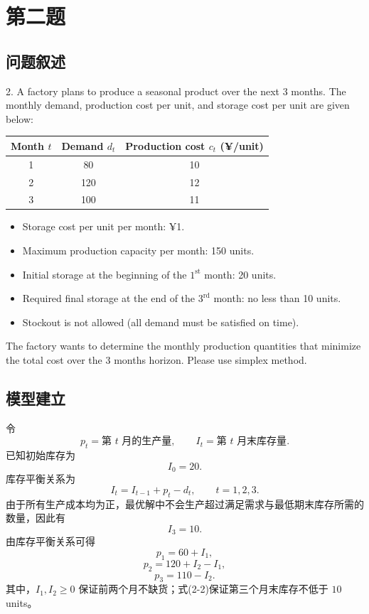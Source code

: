 ﻿\documentclass[UTF8,zihao=-4,fontset=none]{ctexart}
\begin{document}
\section{第二题}

\subsection{问题叙述}

2. A factory plans to produce a seasonal product over the next 3 months. The monthly demand, production cost per unit, and storage cost per unit are given below:

\begin{center}
\begin{tabular}{ccc}
\toprule
Month \(t\) & Demand \(d_t\) & Production cost \(c_t\) (¥/unit)\\
\midrule
1 & 80  & 10\\
2 & 120 & 12\\
3 & 100 & 11\\
\bottomrule
\end{tabular}
\end{center}

\begin{itemize}[leftmargin=2.3em]
  \item Storage cost per unit per month: ¥1.
  \item Maximum production capacity per month: 150 units.
  \item Initial storage at the beginning of the \(1^{\mathrm{st}}\) month: 20 units.
  \item Required final storage at the end of the \(3^{\mathrm{rd}}\) month: no less than 10 units.
  \item Stockout is not allowed (all demand must be satisfied on time).
\end{itemize}

The factory wants to determine the monthly production quantities that minimize the total cost over the 3 months horizon. Please use simplex method.

\subsection{模型建立}

令
\[
    p_t=\text{第 }t\text{ 月的生产量},\qquad
    I_t=\text{第 }t\text{ 月末库存量}.
\]
已知初始库存为
\[
    I_0=20.
\]
库存平衡关系为
\[
    I_t=I_{t-1}+p_t-d_t,\qquad t=1,2,3. \tag{2-1}
\]
由于所有生产成本均为正，最优解中不会生产超过满足需求与最低期末库存所需的数量，因此有
\[
    I_3=10. \tag{2-2}
\]
由库存平衡关系可得
\[
    p_1=60+I_1, \tag{2-3}
\]
\[
    p_2=120+I_2-I_1, \tag{2-4}
\]
\[
    p_3=110-I_2. \tag{2-5}
\]
其中，\(I_1,I_2\ge 0\) 保证前两个月不缺货；式(2-2)保证第三个月末库存不低于 \(10\) units。
\end{document}
